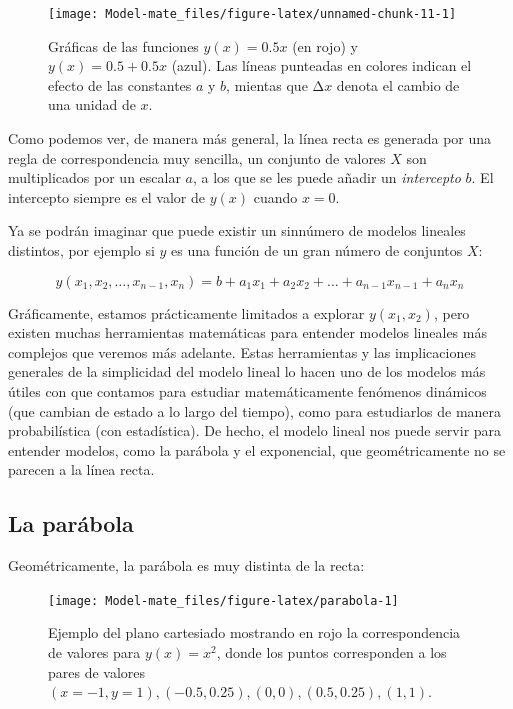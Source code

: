\documentclass[
]{book}
\begin{document}
\begin{figure}

{\centering \texttt{[image: Model-mate\_files/figure-latex/unnamed-chunk-11-1]} 

}

\caption{Gráficas de las funciones $y(x) = 0.5 x$ (en rojo) y $y(x) = 0.5 + 0.5 x$ (azul). Las líneas punteadas en colores indican el efecto de las constantes $a$ y $b$, mientas que Δ$x$ denota el cambio de una unidad de $x$.}\label{fig:unnamed-chunk-11}
\end{figure}

Como podemos ver, de manera más general, la línea recta es generada por una regla de correspondencia muy sencilla, un conjunto de valores \(X\) son multiplicados por un escalar \(a\), a los que se les puede añadir un \emph{intercepto} \(b\). El intercepto siempre es el valor de \(y(x)\) cuando \(x = 0\).

Ya se podrán imaginar que puede existir un sinnúmero de modelos lineales distintos, por ejemplo si \(y\) es una función de un gran número de conjuntos \(X\):

\begin{equation}
y(x_1, x_2, \dots, x_{n-1}, x_n) = b + a_1 x_1 + a_2 x_2 + \dots + a_{n-1} x_{n-1} + a_n x_n
\end{equation}

Gráficamente, estamos prácticamente limitados a explorar \(y(x_1, x_2)\), pero existen muchas herramientas matemáticas para entender modelos lineales más complejos que veremos más adelante. Estas herramientas y las implicaciones generales de la simplicidad del modelo lineal lo hacen uno de los modelos más útiles con que contamos para estudiar matemáticamente fenómenos dinámicos (que cambian de estado a lo largo del tiempo), como para estudiarlos de manera probabilística (con estadística). De hecho, el modelo lineal nos puede servir para entender modelos, como la parábola y el exponencial, que geométricamente no se parecen a la línea recta.

\hypertarget{la-paruxe1bola}{%
\subsection{La parábola}\label{la-paruxe1bola}}

Geométricamente, la parábola es muy distinta de la recta:

\begin{figure}

{\centering \texttt{[image: Model-mate\_files/figure-latex/parabola-1]} 

}

\caption{Ejemplo del plano cartesiado mostrando en rojo la correspondencia de valores para $y(x) = x^2$, donde los puntos corresponden a los pares de valores $(x = -1, y = 1), (-0.5, 0.25), (0, 0), (0.5, 0.25), (1, 1)$.}\label{fig:parabola}
\end{figure}
\end{document}
